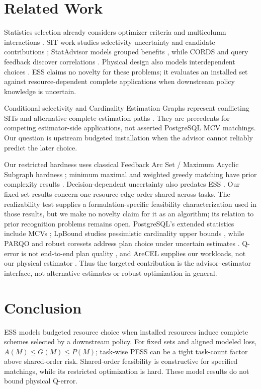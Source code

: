 \documentclass[sigconf, nonacm]{acmart}
\begin{document}
\section{Related Work}
\label{sec:related}
Statistics selection already considers optimizer criteria and
multicolumn interactions \cite{chaudhuri2000stats}. SIT work studies
selectivity uncertainty and candidate contributions
\cite{bruno2002sit}; StatAdvisor models grouped benefits
\cite{elhelw2009statadvisor}, while CORDS and query feedback discover
correlations \cite{ilyas2004cords,haas2007dependencies}. Physical
design also models interdependent choices
\cite{bruno2005relaxation}. ESS claims no novelty for these problems;
it evaluates an installed set against resource-dependent complete
applications when downstream policy knowledge is uncertain.

Conditional selectivity and Cardinality Estimation Graphs represent
conflicting SITs and alternative complete estimation paths
\cite{bruno2004conditional,chen2022ceg}. They are precedents for
competing estimator-side applications, not asserted PostgreSQL MCV
matchings. Our question is upstream budgeted installation when the
advisor cannot reliably predict the later choice.

Our restricted hardness uses classical Feedback Arc Set / Maximum
Acyclic Subgraph hardness \cite{karp1972reducibility}; minimum
maximal and weighted greedy matching have prior complexity results
\cite{yannakakis1980edge,deligkas2017weighted}. Decision-dependent
uncertainty also predates ESS \cite{nohadani2018decision}. Our fixed-set
results concern one resource-edge order shared across tasks. The
realizability test supplies a formulation-specific feasibility
characterization used in those results, but we make no novelty claim
for it as an algorithm; its relation to prior recognition problems
remains open.
PostgreSQL's extended statistics include MCVs \cite{pg16stats};
LpBound studies pessimistic cardinality upper bounds
\cite{zhang2025lpbound}, while PARQO and robust coresets address plan
choice under uncertain estimates \cite{xiu2024parqo,raychaudhury2026coresets}.
Q-error is not end-to-end plan quality
\cite{leis2015optimizers,han2022benchmark}, and AreCEL supplies our
workloads, not our physical estimator \cite{wang2021arecel}. Thus the
targeted contribution is the advisor--estimator interface, not
alternative estimates or robust optimization in general.

\section{Conclusion}
\label{sec:conclusion}
ESS models budgeted resource choice when installed resources induce
complete schemes selected by a downstream policy. For fixed sets and
aligned modeled loss, \(A(M)\leq G(M)\leq P(M)\); task-wise PESS can
be a tight task-count factor above shared-order risk. Shared-order
feasibility is constructive for specified matchings, while its
restricted optimization is hard. These model results do not bound
physical Q-error.
\end{document}
